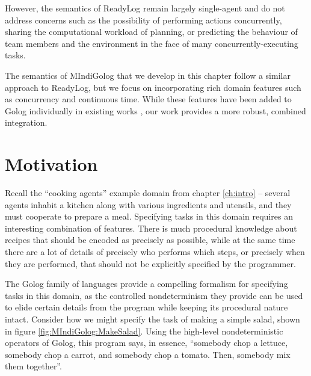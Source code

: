 However, the semantics of ReadyLog remain largely single-agent and
do not address concerns such as the possibility of performing actions
concurrently, sharing the computational workload of planning, or predicting
the behaviour of team members and the environment in the face of many
concurrently-executing tasks.

The semantics of MIndiGolog that we develop in this chapter follow
a similar approach to ReadyLog, but we focus on incorporating rich
domain features such as concurrency and continuous time. While these
features have been added to Golog individually in existing works \citep{Reiter98seq_temp_golog,pinto99tcongolog,pirri00planning_nat_acts,reiter01kia},
our work provides a more robust, combined integration.


\section{Motivation\label{sec:MIndiGolog:Motivation}}

Recall the {}``cooking agents'' example domain from chapter \ref{ch:intro}
-- several agents inhabit a kitchen along with various ingredients
and utensils, and they must cooperate to prepare a meal. Specifying
tasks in this domain requires an interesting combination of features.
There is much procedural knowledge about recipes that should be encoded
as precisely as possible, while at the same time there are a lot of
details of precisely who performs which steps, or precisely when they
are performed, that should not be explicitly specified by the programmer.

The Golog family of languages provide a compelling formalism for specifying
tasks in this domain, as the controlled nondeterminism they provide
can be used to elide certain details from the program while keeping
its procedural nature intact. Consider how we might specify the task
of making a simple salad, shown in figure \ref{fig:MIndiGolog:MakeSalad}.
Using the high-level nondeterministic operators of Golog, this program
says, in essence, {}``somebody chop a lettuce, somebody chop a carrot,
and somebody chop a tomato. Then, somebody mix them together''.

